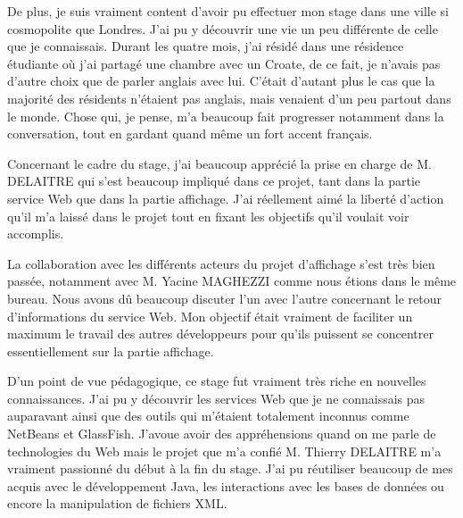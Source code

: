 De plus, je suis vraiment content d'avoir pu effectuer mon stage dans une ville si cosmopolite que Londres.
J'ai pu y d\'ecouvrir une vie un peu diff\'erente de celle que je connaissais.
Durant les quatre mois, j'ai r\'esid\'e dans une r\'esidence \'etudiante o\`u j'ai partag\'e une chambre avec un Croate, de ce fait, je n'avais pas d'autre choix que de parler anglais avec lui.
C'\'etait d'autant plus le cas que la majorit\'e des r\'esidents n'\'etaient pas anglais, mais venaient d'un peu partout dans le monde.
Chose qui, je pense, m'a beaucoup fait progresser notamment dans la conversation, tout en gardant quand m\^eme un fort accent fran\c{c}ais.

Concernant le cadre du stage, j'ai beaucoup appr\'eci\'e la prise en charge de M. DELAITRE qui s'est beaucoup impliqu\'e dans ce projet, tant dans la partie service Web que dans la partie affichage.
J'ai r\'eellement aim\'e la libert\'e d'action qu'il m'a laiss\'e dans le projet tout en fixant les objectifs qu'il voulait voir accomplis.

La collaboration avec les diff\'erents acteurs du projet d'affichage s'est tr\`es bien pass\'ee, notamment avec M. Yacine MAGHEZZI comme nous \'etions dans le m\^eme bureau.
Nous avons d\^u beaucoup discuter l'un avec l'autre concernant le retour d'informations du service Web.
Mon objectif \'etait vraiment de faciliter un maximum le travail des autres d\'eveloppeurs pour qu'ils puissent se concentrer essentiellement sur la partie affichage.

D'un point de vue p\'edagogique, ce stage fut vraiment tr\`es riche en nouvelles connaissances.
J'ai pu y d\'ecouvrir les services Web que je ne connaissais pas auparavant ainsi que des outils qui m'\'etaient totalement inconnus comme NetBeans et GlassFish.
J'avoue avoir des appr\'ehensions quand on me parle de technologies du Web mais le projet que m'a confi\'e M. Thierry DELAITRE m'a vraiment passionn\'e du d\'ebut \`a la fin du stage.
J'ai pu r\'eutiliser beaucoup de mes acquis avec le d\'eveloppement Java, les interactions avec les bases de donn\'ees ou encore la manipulation de fichiers XML.



\clearpage
